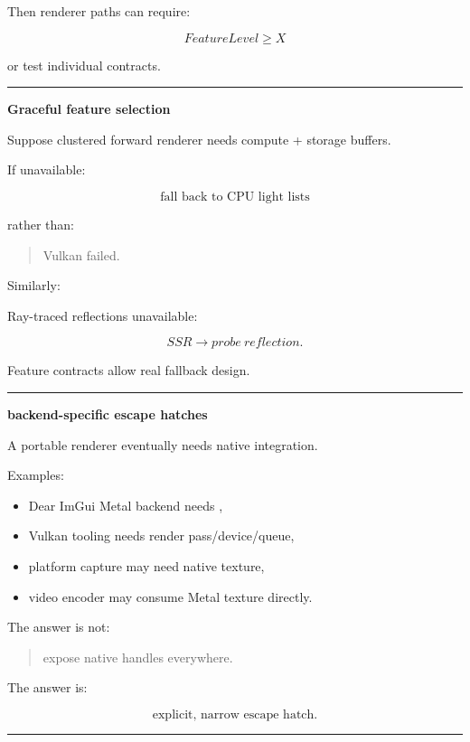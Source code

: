 Then renderer paths can require:

\[
FeatureLevel\ge X
\]

or test individual contracts.

\begin{center}\rule{0.5\linewidth}{0.5pt}\end{center}

\textbf{Graceful feature selection}

Suppose clustered forward renderer needs compute + storage buffers.

If unavailable:

\[
\boxed{
\text{fall back to CPU light lists}
}
\]

rather than:

\begin{quote}
Vulkan failed.
\end{quote}

Similarly:

Ray-traced reflections unavailable:

\[
SSR\rightarrow probe\ reflection.
\]

Feature contracts allow real fallback design.

\begin{center}\rule{0.5\linewidth}{0.5pt}\end{center}

\textbf{backend-specific escape hatches}

A portable renderer eventually needs native integration.

Examples:

\begin{itemize}
\tightlist
\item
  Dear ImGui Metal backend needs ,
\item
  Vulkan tooling needs render pass/device/queue,
\item
  platform capture may need native texture,
\item
  video encoder may consume Metal texture directly.
\end{itemize}

The answer is not:

\begin{quote}
expose native handles everywhere.
\end{quote}

The answer is:

\[
\boxed{
\text{explicit, narrow escape hatch}.
}
\]

\begin{center}\rule{0.5\linewidth}{0.5pt}\end{center}

